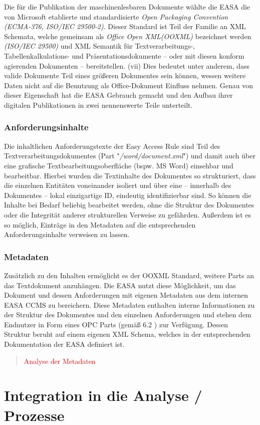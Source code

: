             Die für die Publikation der maschinenlesbaren Dokumente wählte die EASA die von Microsoft etablierte und standardisierte \textit{Open Packaging Convention (ECMA-376, ISO/IEC 29500-2)}.
            Dieser Standard ist Teil der Familie an XML Schemata, welche gemeinsam als \textit{Office Open XML(OOXML)} bezeichnet werden \textit{(ISO/IEC 29500)} und XML Semantik für Textverarbeitungs-, Tabellenkalkulations- und Präsentationsdokumente -- oder mit diesen konform agierenden Dokumenten -- bereitstellen.  \cite{easa_opc_iso}(vii) 
            Dies bedeutet unter anderem, dass valide Dokumente Teil eines größeren Dokumentes sein können, wessen weitere Daten nicht auf die Benutzung als Office-Dokument Einfluss nehmen.
            Genau von dieser Eigenschaft hat die EASA Gebrauch gemacht und den Aufbau ihrer digitalen Publikationen in zwei nennenswerte Teile unterteilt.   

            \subsubsection{Anforderungsinhalte}

            Die inhaltlichen Anforderungstexte der Easy Access Rule sind Teil des Textverarbeitungsdokumentes (Part "\textit{/word/document.xml}") und damit auch über eine grafische Textbearbeitungsoberfläche (bspw. MS Word) einsehbar und bearbeitbar.
            Hierbei wurden die Textinhalte des Dokumentes so strukturiert, dass die einzelnen Entitäten voneinander isoliert und über eine -- innerhalb des Dokumentes -- lokal einzigartige ID, eindeutig identifizierbar sind.
            So können die Inhalte bei Bedarf beliebig bearbeitet werden, ohne die Struktur des Dokumentes oder die Integrität anderer strukturellen Verweise zu gefährden.
            Außerdem ist es so möglich, Einträge in den Metadaten auf die entsprechenden Anforderungsinhalte verweisen zu lassen. 

            \pagebreak
            \subsubsection{Metadaten}

            Zusätzlich zu den Inhalten ermöglicht es der OOXML Standard, weitere Parts an das Textdokument anzuhängen.
            Die EASA nutzt diese Möglichkeit, um das Dokument und dessen Anforderungen mit eigenen Metadaten aus dem internen EASA CCMS zu bereichern.
            Diese Metadaten enthalten interne Informationen zu der Struktur des Dokumentes und den einzelnen Anforderungen und stehen dem Endnutzer in Form eines OPC Parts (gemäß 6.2 \cite{easa_opc_iso}) zur Verfügung.
            Dessen Struktur beruht auf einem eigenen XML Schema, welches in der entsprechenden Dokumentation der EASA definiert ist.

            

            \begin{quote}
\textcolor{red}{Analyse der Metadaten}
\end{quote}
        
    \pagebreak
    \section{Integration in die Analyse / Prozesse}